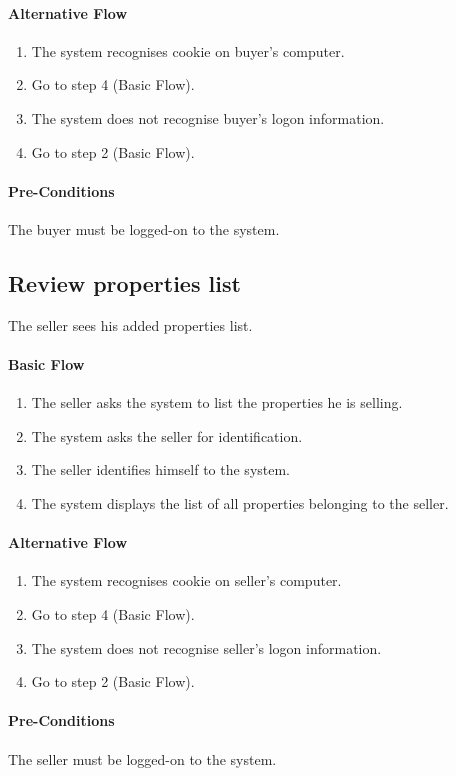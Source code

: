\documentclass[a4paper,12pt]{article}
\begin{document}
\paragraph{Alternative Flow}
\begin{enumerate}
\item The system recognises cookie on buyer's computer.
\item Go to step 4 (Basic Flow).
\item The system does not recognise buyer's logon information.
\item Go to step 2 (Basic Flow).
\end{enumerate}
\paragraph{Pre-Conditions}
The buyer must be logged-on to the system.

\subsection{Review properties list}
The seller sees his added properties list.
\paragraph{Basic Flow}
\begin{enumerate}
\item The seller asks the system to list the properties he is selling.
\item The system asks the seller for identification.
\item The seller identifies himself to the system.
\item The system displays the list of all properties belonging to the seller.
\end{enumerate}
\paragraph{Alternative Flow}
\begin{enumerate}
\item The system recognises cookie on seller's computer.
\item Go to step 4 (Basic Flow).
\item The system does not recognise seller's logon information.
\item Go to step 2 (Basic Flow).
\end{enumerate}
\paragraph{Pre-Conditions}
The seller must be logged-on to the system.
\end{document}
